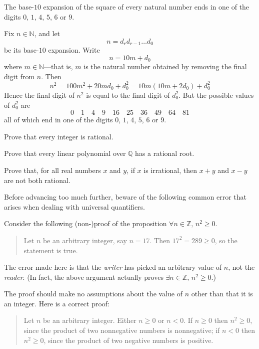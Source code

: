 \begin{proposition}
The base-$10$ expansion of the square of every natural number ends in one of the digits $0$, $1$, $4$, $5$, $6$ or $9$.
\end{proposition}

\begin{cproof}
Fix $n \in \mathbb{N}$, and let
\[n=d_rd_{r-1} \dots d_0\]
be its base-$10$ expansion. Write
\[n=10m+d_0\]
where $m \in \mathbb{N}$---that is, $m$ is the natural number obtained by removing the final digit from $n$. Then
\[n^2=100m^2+20md_0+d_0^2 = 10m(10m+2d_0)+d_0^2\]
Hence the final digit of $n^2$ is equal to the final digit of $d_0^2$. But the possible values of $d_0^2$ are
\[0 \quad 1 \quad 4 \quad 9 \quad 16 \quad 25 \quad 36 \quad 49 \quad 64 \quad 81\]
all of which end in one of the digits $0$, $1$, $4$, $5$, $6$ or $9$.
\end{cproof}

\begin{exercise}
\label{exEveryIntegerIsRational}
Prove that every integer is rational.
\end{exercise}

\begin{exercise}
Prove that every linear polynomial over $\mathbb{Q}$ has a rational root.
\end{exercise}

\begin{exercise}
Prove that, for all real numbers $x$ and $y$, if $x$ is irrational, then $x+y$ and $x-y$ are not both rational.
\end{exercise}

Before advancing too much further, beware of the following common error that arises when dealing with universal quantifiers.

\begin{commonerror}
Consider the following (non-)proof of the proposition $\forall n \in \mathbb{Z},\, n^2 \ge 0$.

\begin{quote}
Let $n$ be an arbitrary integer, say $n=17$. Then $17^2 = 289 \ge 0$, so the statement is true.
\end{quote}

The error made here is that the \textit{writer} has picked an arbitrary value of $n$, not the \textit{reader}. (In fact, the above argument actually proves $\exists n \in \mathbb{Z},\, n^2 \ge 0$.)

The proof should make no assumptions about the value of $n$ other than that it is an integer. Here is a correct proof:

\begin{quote}
Let $n$ be an arbitrary integer. Either $n \ge 0$ or $n < 0$. If $n \ge 0$ then $n^2 \ge 0$, since the product of two nonnegative numbers is nonnegative; if $n<0$ then $n^2 \ge 0$, since the product of two negative numbers is positive.
\end{quote}
\end{commonerror}

